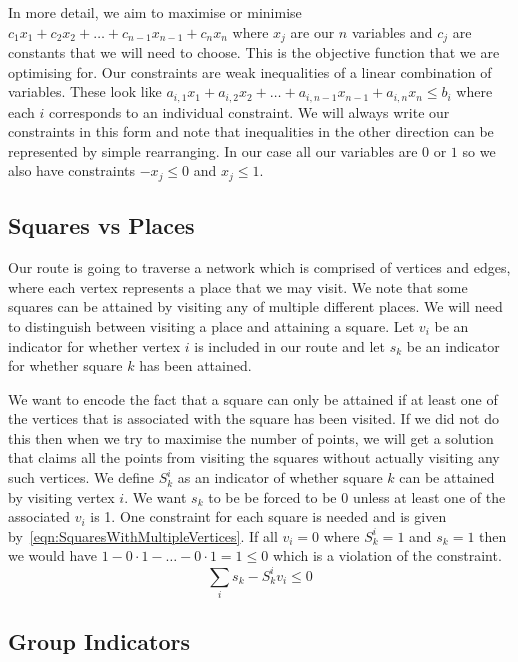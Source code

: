 In more detail, we aim to maximise or minimise $c_1 x_1 + c_2 x_2 + \dots + c_{n-1} x_{n-1} + c_n x_n$ where $x_j$ are our $n$ variables and $c_j$ are constants that we will need to choose. This is the objective function that we are optimising for. Our constraints are weak inequalities of a linear combination of variables. These look like $a_{i, 1} x_1 + a_{i, 2} x_2 + \dots + a_{i, n-1} x_{n-1} + a_{i, n} x_n \le b_i$ where each $i$ corresponds to an individual constraint. We will always write our constraints in this form and note that inequalities in the other direction can be represented by simple rearranging. In our case all our variables are $0$ or $1$ so we also have constraints $-x_j \le 0$ and $x_j \le 1$.

\subsection{Squares vs Places}
\label{sec:SquaresVsPlaces}

Our route is going to traverse a network which is comprised of vertices and edges, where each vertex represents a place that we may visit. We note that some squares can be attained by visiting any of multiple different places. We will need to distinguish between visiting a place and attaining a square. Let $v_i$ be an indicator for whether vertex $i$ is included in our route and let $s_k$ be an indicator for whether square $k$ has been attained.

We want to encode the fact that a square can only be attained if at least one of the vertices that is associated with the square has been visited. If we did not do this then when we try to maximise the number of points, we will get a solution that claims all the points from visiting the squares without actually visiting any such vertices. We define $S_k^i$ as an indicator of whether square $k$ can be attained by visiting vertex $i$. We want $s_k$ to be be forced to be $0$ unless at least one of the associated $v_i$ is 1. One constraint for each square is needed and is given by~\eqref{eqn:SquaresWithMultipleVertices}. If all $v_i = 0$ where $S_k^i = 1$ and $s_k = 1$ then we would have $1 - 0 \cdot 1 - \dots - 0 \cdot 1 = 1 \le 0$ which is a violation of the constraint.
\begin{equation}
	\sum_i s_k - S_k^i v_i \le 0
	\label{eqn:SquaresWithMultipleVertices}
\end{equation}

\subsection{Group Indicators}
\label{sec:GroupIndicators}

